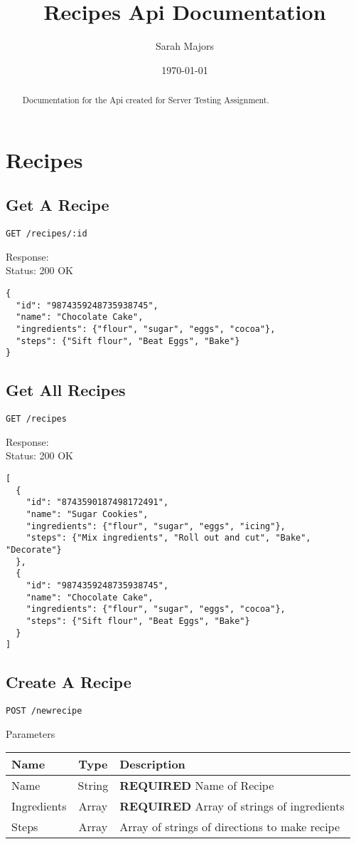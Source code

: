 \documentclass[a4paper]{article}
\title{Recipes Api Documentation}
\author{Sarah Majors}
\date{\today}
\begin{document}
\maketitle

\begin{abstract}
Documentation for the Api created for Server Testing Assignment.
\end{abstract}

\section{Recipes}
\label{sec: Recipes}

\subsection{Get A Recipe}
\begin{verbatim}
GET /recipes/:id
\end{verbatim}
Response: \\
Status: 200 OK
\begin{verbatim}
{
  "id": "9874359248735938745",
  "name": "Chocolate Cake",
  "ingredients": {"flour", "sugar", "eggs", "cocoa"},
  "steps": {"Sift flour", "Beat Eggs", "Bake"}
}
\end{verbatim}

\subsection{Get All Recipes}
\begin{verbatim}
GET /recipes
\end{verbatim}
Response: \\
Status: 200 OK
\begin{verbatim}
[
  {
    "id": "8743590187498172491",
    "name": "Sugar Cookies",
    "ingredients": {"flour", "sugar", "eggs", "icing"},
    "steps": {"Mix ingredients", "Roll out and cut", "Bake", "Decorate"}
  },
  {
    "id": "9874359248735938745",
    "name": "Chocolate Cake",
    "ingredients": {"flour", "sugar", "eggs", "cocoa"},
    "steps": {"Sift flour", "Beat Eggs", "Bake"}
  }
]
\end{verbatim}

\subsection{Create A Recipe}
\begin{verbatim}
POST /newrecipe
\end{verbatim}
Parameters \\
\begin{table}[h]
\centering
\begin{tabular}{l|c|l}
Name & Type & Description \\\hline
Name & String & \textbf{REQUIRED} Name of Recipe \\
Ingredients & Array & \textbf{REQUIRED} Array of strings of ingredients \\
Steps & Array & Array of strings of directions to make recipe
\end{tabular}
\end{table}
\end{document}
